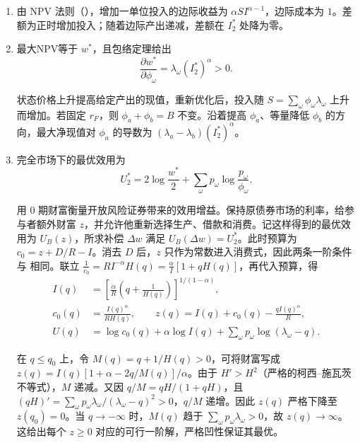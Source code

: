 \begin{solution}[blank-type=manual,blank-vsep=9\baselineskip]
\begin{enumerate}[label=(\alph*)]
再在预算 $c_0+\sum_\omega\phi_\omega c_\omega=w^*$ 下选择消费。令预算乘子为 $\nu$，一阶条件为 $1/c_0=\nu$、$p_\omega/c_\omega=\nu\phi_\omega$。消去 $\nu$，得到 $\phi_\omega c_\omega=p_\omega c_0$。未来消费支出的现值合计等于 $c_0$，因此
\[
 c_0^*=\frac{w^*}{2},\quad c_\omega^*=\frac{p_\omega w^*}{2\phi_\omega}.
\]

风险证券和债券头寸为
\[
 \theta_S^*=\frac{c_a^*-c_b^*}{\lambda_a-\lambda_b}-(I_2^*)^\alpha,\qquad
 \theta_B^*=c_a^*-\lambda_a\bigl[(I_2^*)^\alpha+\theta_S^*\bigr].
\]

两式同时复制所需终期消费，0期预算随状态价格条件成立。
\item 由 NPV 法则\ifdefined\WJHandoutKnowledge（）\fi，增加一单位投入的边际收益为 $\alpha SI^{\alpha-1}$，边际成本为 $1$。差额为正时增加投入；随着边际产出递减，差额在 $I_2^*$ 处降为零。
\item 最大NPV等于 $w^*$，且包络定理给出
\[
 \frac{\partial w^*}{\partial\phi_\omega}=\lambda_\omega(I_2^*)^\alpha>0.
\]

状态价格上升提高给定产出的现值，重新优化后，投入随 $S=\sum_\omega\phi_\omega\lambda_\omega$ 上升而增加。若固定 $r_F$，则 $\phi_a+\phi_b=B$ 不变。沿着提高 $\phi_a$、等量降低 $\phi_b$ 的方向，最大净现值对 $\phi_a$ 的导数为 $(\lambda_a-\lambda_b)(I_2^*)^\alpha$。
\item 完全市场下的最优效用为
\[
 U_2^*=2\log\frac{w^*}{2}+\sum_\omega p_\omega\log\frac{p_\omega}{\phi_\omega}.
\]

用 0 期财富衡量开放风险证券带来的效用增益。保持原债券市场的利率，给参与者额外财富 $z$，并允许他重新选择生产、借款和消费。记这样得到的最优效用为 $U_B(z)$，所求补偿 $\Delta w$ 满足 $U_B(\Delta w)=U_2^*$。此时预算为 $c_0=z+D/R-I$。消去 $D$ 后，$z$ 只作为常数进入消费式，因此两条一阶条件与 相同。联立 $\frac1{c_0}=RI^{-\alpha}H(q)=\frac{\alpha}{I}[1+qH(q)]$，再代入预算，得
\[
 \begin{aligned}
 I(q)&=\left[\frac{\alpha}{R}\left(q+\frac1{H(q)}\right)\right]^{1/(1-\alpha)},\\
 c_0(q)&=\frac{I(q)^\alpha}{RH(q)},\qquad
 z(q)=I(q)+c_0(q)-\frac{qI(q)^\alpha}{R},\\
 U(q)&=\log c_0(q)+\alpha\log I(q)
 +\sum_\omega p_\omega\log(\lambda_\omega-q).
 \end{aligned}
\]

在 $q\le q_0$ 上，令 $M(q)=q+1/H(q)>0$，可将财富写成 $z(q)=I(q)[1+\alpha-2q/M(q)]/\alpha$。由于 $H'>H^2$（严格的柯西--施瓦茨不等式），$M$ 递减。又因 $q/M=qH/(1+qH)$，且 $(qH)'=\sum_\omega p_\omega\lambda_\omega/(\lambda_\omega-q)^2>0$，$q/M$ 递增。因此 $z(q)$ 严格下降至 $z(q_0)=0$。当 $q\to-\infty$ 时，$M(q)$ 趋于 $\sum_\omega p_\omega\lambda_\omega>0$，故 $z(q)\to\infty$。这给出每个 $z\ge0$ 对应的可行一阶解，严格凹性保证其最优。


\end{enumerate}
\end{solution}

